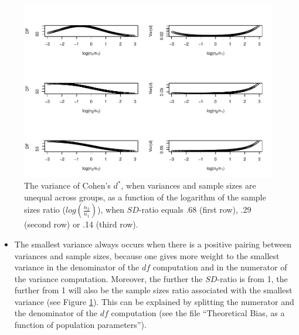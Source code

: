 \documentclass[
  english,
  man,mask]{apa6}
\providecommand{\tightlist}{%
  \setlength{\itemsep}{0pt}\setlength{\parskip}{0pt}}
\begin{document}
\begin{figure}
\centering
\includegraphics{Theoretical-Bias-of-all-estimators-as-a-function-of-population-parameters_files/figure-latex/varcohendprimehetunbalnratiosdratio2-1.pdf}
\caption{\label{fig:varcohendprimehetunbalnratiosdratio2}The variance of Cohen's \(d^*\), when variances and sample sizes are unequal across groups, as a function of the logarithm of the sample sizes ratio (\(log \left( \frac{n_2}{n_1} \right)\)), when \(SD\)-ratio equals .68 (first row), .29 (second row) or .14 (third row).}
\end{figure}

\begin{itemize}
\tightlist
\item
  The smallest variance always occurs when there is a positive pairing between variances and sample sizes, because one gives more weight to the smallest variance in the denominator of the \(df\) computation and in the numerator of the variance computation. Moreover, the further the \(SD\)-ratio is from 1, the further from 1 will also be the sample sizes ratio associated with the smallest variance (see Figure \ref{fig:varcohendprimehetunbalnratiosdratio2}). This can be explained by splitting the numerator and the denominator of the \(df\) computation (see the file ``Theoretical Bias, as a function of population parameters'').
\end{itemize}
\end{document}
